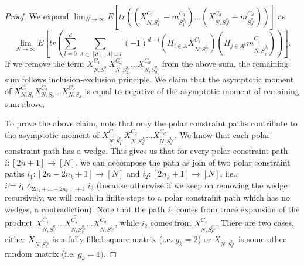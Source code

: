 \documentclass[12pt]{amsart}
\theoremstyle{definition}
\theoremstyle{remark}
\begin{document}
\begin{proof}
We expand $\lim_{N \to \infty} E[tr((X_{N,S_1^{g_1}}^{C_1}- m_{S_1^{g_1}}^{C_1})...(X_{N,S_d^{g_d}}^{C_d}- m_{S_d^{g_d}}^{C_d}))]$ as 
\begin{equation}\label{sum1}
    \lim_{N \to \infty} E[tr(\sum_{l=0}^d \sum_{A \subset [d], |A|=l} (-1)^{d-l} (\Pi_{i \in A}X_{N,S_i^{g_i}}^{C_i})(\Pi_{j \in A^c}m_{N,S_j^{g_j}}^{C_j}))].
\end{equation}
If we remove the term $X_{N,S_1^{g_1}}^{C_1}X_{N,S_2^{g_2}}^{C_2}...X_{N,S_d^{g_d}}^{C_d}$ from the above sum, the remaining sum follows inclusion-exclusion principle. We claim that the asymptotic moment of $X_{N,S_1}^{C_1}X_{N,S_2}^{C_2}...X_{N,S_d}^{C_d}$ is equal to negative of the asymptotic moment of remaining sum above. \par

To prove the above claim, note that only the polar constraint paths contribute to the asymptotic moment of $X_{N,S_1^{g_1}}^{C_1}X_{N,S_2^{g_2}}^{C_2}...X_{N,S_d^{g_d}}^{C_d}$. We know that each polar constraint path has a wedge. This gives us that for every polar constraint path $i:[2n+1] \to [N]$, we can decompose the path as join of two polar constraint paths $i_1:[2n-2n_k +1] \to [N]$ and $i_2:[2n_k+1] \to [N]$, i.e., $i= i_1 \wedge_{2n_1+...+2n_{k-1}+1} i_2 $ (because otherwise if we keep on removing the wedge recursively, we will reach in finite steps to a polar constraint path which has no wedges, a contradiction). Note that the path $i_1$ comes from trace expansion of the product $X_{N,S_1^{g_1}}^{C_1}...\widehat{X_{N,S_k^{g_k}}^{C_k}}...X_{N,S_d^{g_d}}^{C_d}$, while $i_2$ comes from $X_{N,S_k^{g_k}}^{C_k}$. There are two cases, either $X_{N,S_k^{g_k}}$ is a fully filled square matrix (i.e. $g_k = 2$) or $X_{N,S_k^{g_k}}$ is some other random matrix (i.e. $g_k=1)$.\par 


\end{proof}
\end{document}
